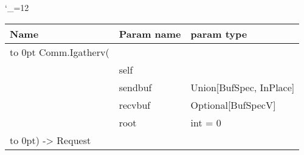 \begingroup \catcode`\_=12 \tt
\begin{tabular}{lll}
\toprule
\textrm{Name}&\textrm{Param name}&\textrm{param type}\\
\midrule
\hbox to 0pt {Comm.Igatherv(\hss}\\
& self\\
& sendbuf & Union[BufSpec, InPlace]\\
& recvbuf & Optional[BufSpecV]\\
& root & int = 0\\
\hbox to 0pt{) -> Request\hss}\\
\bottomrule
\end{tabular}
\endgroup
